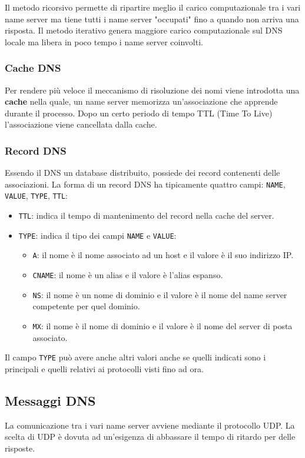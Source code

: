 Il metodo ricorsivo permette di ripartire meglio il carico computazionale tra i vari name server
ma tiene tutti i name server "occupati" fino a quando non arriva una risposta. Il metodo iterativo
genera maggiore carico computazionale sul DNS locale ma libera in poco tempo i name server
coinvolti.

\subsubsection{Cache DNS}
Per rendere più veloce il meccanismo di risoluzione dei nomi viene introdotta una \textbf{cache}
nella quale, un name server memorizza un'associazione che apprende durante il processo. Dopo un
certo periodo di tempo TTL (Time To Live) l'associazione viene cancellata dalla cache.

\subsubsection{Record DNS}
Essendo il DNS un database distribuito, possiede dei record contenenti delle associazioni.
La forma di un record DNS ha tipicamente quattro campi: \verb|NAME|, \verb|VALUE|, \verb|TYPE|,
\verb|TTL|:
\begin{itemize}
	\item \verb|TTL|: indica il tempo di mantenimento del record nella cache del server.
	\item \verb|TYPE|: indica il tipo dei campi \verb|NAME| e \verb|VALUE|:
	      \begin{itemize}
		      \item \verb|A|: il nome è il nome associato ad un host e il valore è
		            il suo indirizzo IP.
		      \item \verb|CNAME|: il nome è un alias e il valore è l'alias espanso.
		      \item \verb|NS|: il nome è un nome di dominio e il valore è il nome del name server
		            competente per quel dominio.
		      \item \verb|MX|: il nome è il nome di dominio e il valore è il nome del server di
		            posta associato.
	      \end{itemize}
\end{itemize}
Il campo \verb|TYPE| può avere anche altri valori anche se quelli indicati sono i principali e
quelli relativi ai protocolli visti fino ad ora.

\subsection{Messaggi DNS}
La comunicazione tra i vari name server avviene mediante il protocollo UDP.  La scelta di UDP è
dovuta ad un'esigenza di abbassare il tempo di ritardo per delle risposte.

